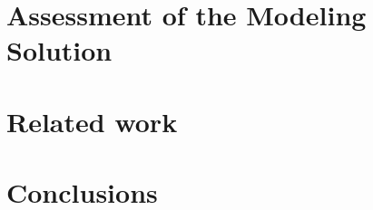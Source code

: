 \documentclass[american]{emisa}
\begin{document}
\begin{article}
\section{Assessment of the Modeling Solution}
\label{sec:discussion}


\section{Related work}
\label{sec:relatedwork}


\section{Conclusions}


\printbibliography

\end{article}
\end{document}
